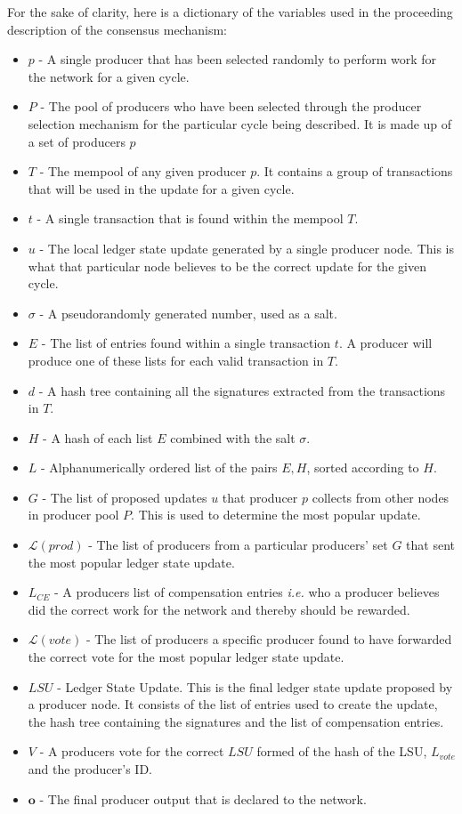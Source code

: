 For the sake of clarity, here is a dictionary of the variables used in the proceeding description of the consensus mechanism:

\begin{itemize}

\item $p$ - A single producer that has been selected randomly to perform work for the network for a given cycle.
\item $P$ - The pool of producers who have been selected through the producer selection mechanism for the particular cycle being described. It is made up of a set of producers $p$
\item $T$ - The mempool of any given producer $p$. It contains a group of transactions that will be used in the update for a given cycle.
\item $t$ - A single transaction that is found within the mempool $T$.
\item $u$ - The local ledger state update generated by a single producer node. This is what that particular node believes to be the correct update for the given cycle.
\item $\sigma$ - A pseudorandomly generated number, used as a salt.
\item $E$ - The list of entries found within a single transaction $t$. A producer will produce one of these lists for each valid transaction in $T$.
\item $d$ - A hash tree containing all the signatures extracted from the transactions in $T$.
\item $H$ - A hash of each list $E$ combined with the salt $\sigma$.
\item $L$ - Alphanumerically ordered list of the pairs $E,H$, sorted according to $H$.
\item $G$ - The list of proposed updates $u$ that producer $p$ collects from other nodes in producer pool $P$. This is used to determine the most popular update.
\item $\mathcal{L}(prod)$ - The list of producers from a particular producers' set $G$ that sent the most popular ledger state update.
\item $L_{CE}$ - A producers list of compensation entries \textit{i.e.} who a producer believes did the correct work for the network and thereby should be rewarded.
\item $\mathcal{L}(vote)$ - The list of producers a specific producer found to have forwarded the correct vote for the most popular ledger state update.
\item $LSU$ - Ledger State Update. This is the final ledger state update proposed by a producer node. It consists of the list of entries used to create the update, the hash tree containing the signatures and the list of compensation entries.
\item $V$ - A producers vote for the correct $LSU$ formed of the hash of the LSU, $L_{vote}$ and the producer's ID.
\item $\mathbf{o}$ - The final producer output that is declared to the network.
\end{itemize}